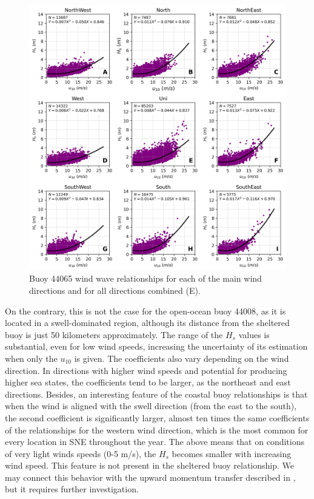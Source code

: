 \begin{figure}[H]
\centering
\includegraphics[width=0.95\linewidth]{Figures/Chapter5/b44065_wind_wave.png}
\caption{Buoy 44065 wind wave relationships for each of the main wind directions and for all directions combined (E).}
\label{fig:wind_wave_44065}
\end{figure}


On the contrary, this is not the case for the open-ocean buoy 44008, as it is located in a swell-dominated region, although its distance from the sheltered buoy is just 50 kilometers approximately. The range of the $H_{s}$ values is substantial, even for low wind speeds, increasing the uncertainty of its estimation when only the $u_{10}$ is given. The coefficients also vary depending on the wind direction. In directions with higher wind speeds and potential for producing higher sea states, the coefficients tend to be larger, as the northeast and east directions.
Besides, an interesting feature of the coastal buoy relationships is that when the wind is aligned with the swell direction (from the east to the south), the second coefficient is significantly larger, almost ten times the same coefficients of the relationships for the western wind direction, which is the most common for every location in SNE throughout the year. The above means that on conditions of very light winds speeds (0-5 m/s), the $H_{s}$ becomes smaller with increasing wind speed. This feature is not present in the sheltered buoy relationship. We may connect this behavior with the upward momentum transfer described in \cite{Grachev2001}, but it requires further investigation.


